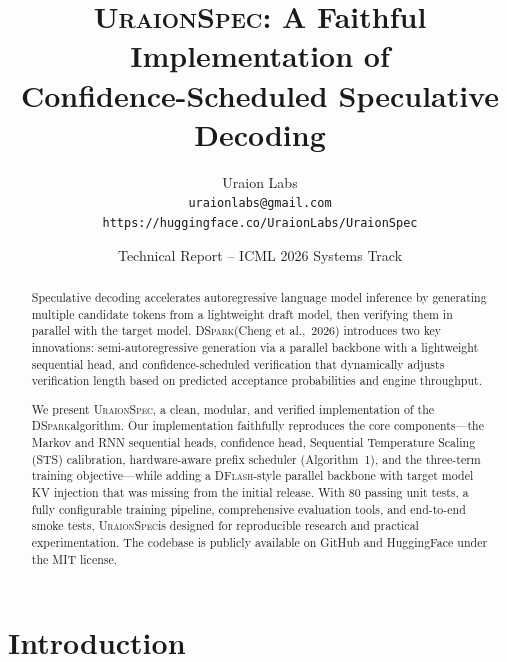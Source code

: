 \documentclass[11pt,a4paper]{article}
\newcommand{\UraionSpec}{\textsc{UraionSpec}}
\newcommand{\DSpark}{\textsc{DSpark}}
\newcommand{\DFlash}{\textsc{DFlash}}
\begin{document}
\title{\textbf{\UraionSpec}: A Faithful Implementation of \\ Confidence-Scheduled Speculative Decoding}

\author{%
  \normalsize Uraion Labs \\[4pt]
  \texttt{uraionlabs@gmail.com} \\[2pt]
  \texttt{https://huggingface.co/UraionLabs/UraionSpec}
}

\date{\normalsize Technical Report -- ICML 2026 Systems Track}

\maketitle

\begin{abstract}
Speculative decoding accelerates autoregressive language model inference by
generating multiple candidate tokens from a lightweight draft model, then
verifying them in parallel with the target model. \DSpark (Cheng et al.,~2026)
introduces two key innovations: semi-autoregressive generation via a parallel
backbone with a lightweight sequential head, and confidence-scheduled
verification that dynamically adjusts verification length based on predicted
acceptance probabilities and engine throughput.

We present \UraionSpec, a clean, modular, and verified implementation of the
\DSpark algorithm. Our implementation faithfully reproduces the core
components---the Markov and RNN sequential heads, confidence head, Sequential
Temperature Scaling (STS) calibration, hardware-aware prefix scheduler
(Algorithm~1), and the three-term training objective---while adding a
\DFlash-style parallel backbone with target model KV injection that was
missing from the initial release. With 80 passing unit tests, a fully
configurable training pipeline, comprehensive evaluation tools, and
end-to-end smoke tests, \UraionSpec is designed for reproducible research
and practical experimentation. The codebase is publicly available on
GitHub and HuggingFace under the MIT license.
\end{abstract}

\section{Introduction}
\label{sec:introduction}
\end{document}

